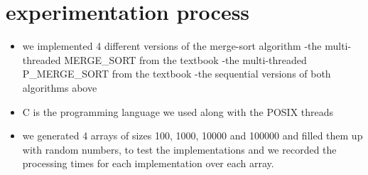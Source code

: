 \documentclass[12pt]{article}
\begin{document}
	\section {experimentation process}
		\begin{itemize}
			\item we implemented 4 different versions of the merge-sort algorithm
					\subitem -the multi-threaded MERGE\_SORT from  the textbook
					\subitem -the multi-threaded P\_MERGE\_SORT from the textbook
					\subitem -the sequential versions of both algorithms above
			\item C is the programming language we used along with the POSIX threads
			\item we generated 4 arrays of sizes 100, 1000, 10000 and 100000  and filled them up with random numbers, to test the implementations and we recorded the processing times for each implementation over each array.
		\end{itemize}
\end{document}
